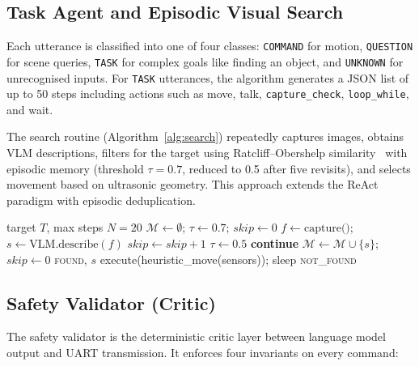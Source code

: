 \documentclass[conference]{IEEEtran}
\begin{document}
\subsection{Task Agent and Episodic Visual Search}
\label{sec:search}

Each utterance is classified into one of four classes: \texttt{COMMAND} for motion, \texttt{QUESTION} for scene queries, \texttt{TASK} for complex goals like finding an object, and \texttt{UNKNOWN} for unrecognised inputs. For \texttt{TASK} utterances, the algorithm generates a JSON list of up to 50 steps including actions such as move, talk, \texttt{capture\_check}, \texttt{loop\_while}, and wait.

The search routine (Algorithm~\ref{alg:search}) repeatedly captures images, obtains VLM descriptions, filters for the target using Ratcliff--Obershelp similarity~\cite{ratcliff1988} with episodic memory (threshold $\tau{=}0.7$, reduced to 0.5 after five revisits), and selects movement based on ultrasonic geometry. This approach extends the ReAct~\cite{yao2023react} paradigm with episodic deduplication.

\begin{algorithm}[t]
\caption{Episodic visual search (VLM-driven)}
\label{alg:search}
\begin{algorithmic}[1]
\REQUIRE target $T$, max steps $N{=}20$
\STATE $\mathcal{M} \leftarrow \emptyset$; $\tau \leftarrow 0.7$; $\mathit{skip} \leftarrow 0$
  \STATE $f \leftarrow \text{capture()}$;
         $s \leftarrow \text{VLM.describe}(f)$
    \STATE $\mathit{skip} \leftarrow \mathit{skip} + 1$
      \STATE $\tau \leftarrow 0.5$
    \ENDIF
    \STATE \textbf{continue}
  \ENDIF
  \STATE $\mathcal{M} \leftarrow \mathcal{M} \cup \{s\}$; $\mathit{skip} \leftarrow 0$
    \RETURN \textsc{found}, $s$
  \ENDIF
  \STATE execute(heuristic\_move(sensors)); sleep
\ENDFOR
\RETURN \textsc{not\_found}
\end{algorithmic}
\end{algorithm}

\subsection{Safety Validator (Critic)}
\label{sec:validator}

The safety validator is the deterministic critic layer between language model output and UART transmission. It enforces four invariants on every command:
\end{document}
